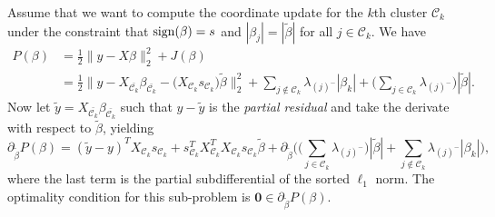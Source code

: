 Assume that we want to compute the coordinate update for the \(k\)th cluster
\(\mathcal{C}_k\) under the constraint that \(\operatorname{sign}(\beta) = s\) and
\(|\beta_j| = |\tilde \beta|\) for all \(j \in \mathcal{C}_k\).
We have
\[
  \begin{aligned}
    P(\beta) & =  \frac{1}{2} \lVert y - X\beta\rVert_2^2 + J(\beta)                                                                                                                                                                                                                                   \\
             & = \frac{1}{2} \lVert y - X_{\bar{\mathcal{C}_k}} \beta_{\bar{\mathcal{C}_k}} - \big(X_{\mathcal{C}_k} s_{\mathcal{C}_k}\big)\tilde\beta  \rVert_2^2 + \sum_{j \notin {\mathcal{C}_k}} \lambda_{(j)^-}|\beta_k| + \bigg(\sum_{j \in {\mathcal{C}_k}} \lambda_{(j)^-}\bigg)|\tilde\beta|.
  \end{aligned}
\]
Now let \(\tilde y = X_{\bar{\mathcal{C}_k}} \beta_{\bar{\mathcal{C}_k}}\)
such that \(y - \tilde y\) is the \emph{partial residual} and take the
derivate with respect to \(\tilde\beta\), yielding
\begin{equation}
  \label{eq:cluster-grad}
  \partial_{\tilde\beta}
  P(\beta) = (\tilde y - y)^T X_{\mathcal{C}_k} s_{\mathcal{C}_k} + s_{\mathcal{C}_k}^T X_{{\mathcal{C}_k}}^T X_{\mathcal{C}_k} s_{\mathcal{C}_k} \tilde\beta + \partial_{\tilde\beta}\Bigg(\bigg(\sum_{j \in {\mathcal{C}_k}} \lambda_{(j)^-}\bigg)|\tilde\beta| + \sum_{j \notin \mathcal{C}_k}\lambda_{(j)^-}|\beta_k|\Bigg),
\end{equation}
where the last term is the partial subdifferential of the sorted \(\ell_1\)
norm.
The optimality condition for this sub-problem is \(\boldsymbol{0} \in
\partial_{\tilde \beta} P(\beta).
\)

